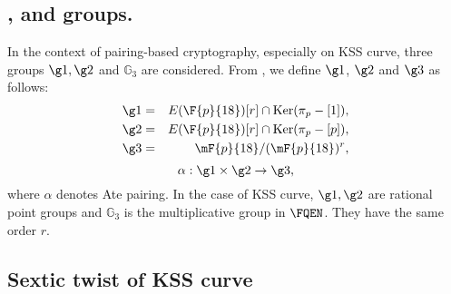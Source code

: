         \subsection{,  and  groups.} In the context of pairing-based cryptography, especially on KSS curve, three groups $\g1, \g2$ and $\mathbb{G}_3$ are considered. From \cite{PAIRING:MANS13}, we define $\g1$, $\g2$ and $\g3$ as follows:
        \begin{eqnarray}\label{eq:g1}
        \g1 & = &  E(\F{p}{18}) [r] \cap \text{Ker}(\pi_p - [1]), \nonumber \\
        \g2 & = &  E(\F{p}{18}) [r] \cap \text{Ker}(\pi_p - [p]), \nonumber \\
        \g3 & = & \mF{p}{18}/(\mF{p}{18})^r, \nonumber
        \end{eqnarray}
        \begin{equation}
        \alpha : \g1 \times \g2 \rightarrow \g3,
        \end{equation}
        where $\alpha$ denotes Ate pairing. In the case of KSS curve, $\g1, \g2$ are rational point groups and $\mathbb{G}_3$ is the multiplicative group in $\FQEN$. They have the same order $r$. 
        
        \subsection{Sextic twist of KSS curve}
        
